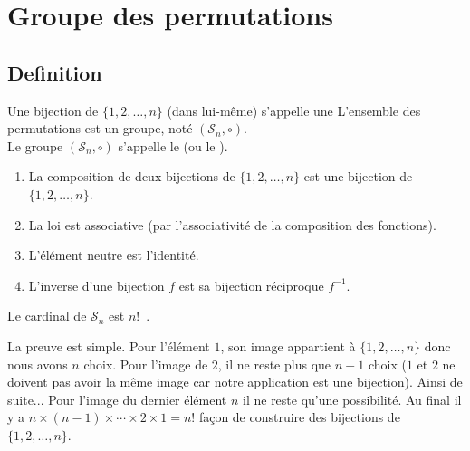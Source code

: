 \documentclass{book}
\begin{document}
\section{Groupe des permutations}
\subsection{Definition}
\begin{DefinitionProposition}
Une bijection de $\{1,2,\ldots,n\}$ (dans lui-même) s'appelle une 
L'ensemble des permutations  est un groupe, noté $(\mathcal{S}_n,\circ)$.\\
Le groupe $(\mathcal{S}_n,\circ)$ s'appelle le 
(ou le ).
\end{DefinitionProposition}

\begin{Demonstration}

\begin{enumerate}
  \item La composition de deux bijections de $\{1,2,\ldots,n\}$ est une bijection de $\{1,2,\ldots,n\}$.
  \item La loi est associative (par l'associativité de la composition des fonctions).
  \item L'élément neutre est l'identité.
  \item L'inverse d'une bijection $f$ est sa bijection réciproque $f^{-1}$.
\end{enumerate}
\end{Demonstration}


\begin{Lemme}
Le cardinal de $\mathcal{S}_n$ est $n!$~.
\end{Lemme}

\begin{Demonstration}
La preuve est simple. Pour l'élément $1$, son image appartient à $\{1,2,\ldots,n\}$ donc nous avons $n$ choix.
Pour l'image de $2$, il ne reste plus que $n-1$ choix ($1$ et $2$ ne doivent pas avoir la même image car
notre application est une bijection).
Ainsi de suite... Pour l'image du dernier élément $n$ il ne reste qu'une possibilité.
Au final
il y a $n\times(n-1)\times \cdots \times 2 \times 1 = n!$ façon de construire des bijections
de  $\{1,2,\ldots,n\}$.
\end{Demonstration}
\end{document}

